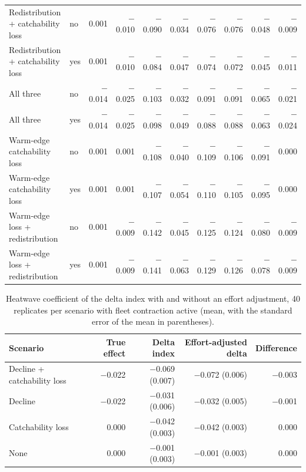 \documentclass[11pt,a4paper]{article}
\begin{document}
\begin{table}[htbp]
\begin{tabular}{@{}>{\raggedright\arraybackslash}p{2.9cm}lrrrrrrrr@{}}
Redistribution + catchability loss & no & 0.001 & $-$0.010 & $-$0.090 & $-$0.034 & $-$0.076 & $-$0.076 & $-$0.048 & $-$0.009 \\
Redistribution + catchability loss & yes & 0.001 & $-$0.010 & $-$0.084 & $-$0.047 & $-$0.074 & $-$0.072 & $-$0.045 & $-$0.011 \\
All three & no & $-$0.014 & $-$0.025 & $-$0.103 & $-$0.032 & $-$0.091 & $-$0.091 & $-$0.065 & $-$0.021 \\
All three & yes & $-$0.014 & $-$0.025 & $-$0.098 & $-$0.049 & $-$0.088 & $-$0.088 & $-$0.063 & $-$0.024 \\
Warm-edge catchability loss & no & 0.001 & 0.001 & $-$0.108 & $-$0.040 & $-$0.109 & $-$0.106 & $-$0.091 & 0.000 \\
Warm-edge catchability loss & yes & 0.001 & 0.001 & $-$0.107 & $-$0.054 & $-$0.110 & $-$0.105 & $-$0.095 & 0.000 \\
Warm-edge loss + redistribution & no & 0.001 & $-$0.009 & $-$0.142 & $-$0.045 & $-$0.125 & $-$0.124 & $-$0.080 & $-$0.009 \\
Warm-edge loss + redistribution & yes & 0.001 & $-$0.009 & $-$0.141 & $-$0.063 & $-$0.129 & $-$0.126 & $-$0.078 & $-$0.009 \\
\bottomrule
\end{tabular}
\end{table}

\begin{table}[htbp]
\centering\footnotesize
\caption{Heatwave coefficient of the delta index with and without an effort adjustment, 40 replicates per scenario with fleet contraction active (mean, with the standard error of the mean in parentheses).}
\label{tab:effortdelta}
\begin{tabular}{@{}lrrrr@{}}
\toprule
Scenario & True effect & Delta index & Effort-adjusted delta & Difference \\
\midrule
Decline + catchability loss & $-$0.022 & $-$0.069 (0.007) & $-$0.072 (0.006) & $-$0.003 \\
Decline & $-$0.022 & $-$0.031 (0.006) & $-$0.032 (0.005) & $-$0.001 \\
Catchability loss & 0.000 & $-$0.042 (0.003) & $-$0.042 (0.003) & 0.000 \\
None & 0.000 & $-$0.001 (0.003) & $-$0.001 (0.003) & 0.000 \\
\bottomrule
\end{tabular}
\end{table}
\end{document}
